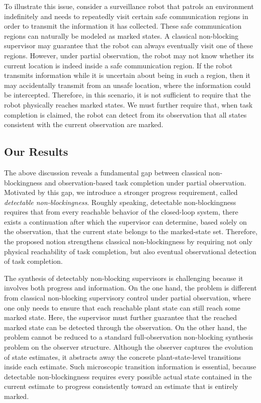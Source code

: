 \documentclass[twocolumn]{autart}
\begin{document}
To illustrate this issue, consider a surveillance robot that patrols an environment indefinitely and needs to repeatedly visit certain safe communication regions in order to transmit the information it has collected.  These safe communication regions can naturally be modeled as marked states.  A classical non-blocking supervisor may guarantee that the robot can always eventually visit one of these regions. However, under partial observation, the robot may not know whether its current location is indeed inside a safe communication region. 
If the robot transmits information while it is uncertain about being in such a region, then it may accidentally transmit from an unsafe location, where the information could be intercepted.  Therefore, in this scenario, it is not sufficient to require that the robot physically reaches marked states.  We must further require that, when task completion is claimed, the robot can detect from its observation that all states consistent with the current observation are marked.

\subsection{Our Results}
%
The above discussion reveals a fundamental gap between classical non-blockingness and observation-based task completion under partial observation. 
Motivated by this gap, we introduce a stronger progress requirement, called \emph{detectable non-blockingness}.
Roughly speaking, detectable non-blockingness requires that from every reachable behavior of the closed-loop system, there exists a continuation after which the supervisor can determine, based solely on the observation, that the current state belongs to the marked-state set.
Therefore, the proposed notion strengthens classical non-blockingness by requiring not only physical reachability of task completion, but also eventual observational detection of task completion.

The synthesis of detectably non-blocking supervisors is challenging because it involves both progress and information. On the one hand, the problem is different from classical non-blocking supervisory control under partial observation, where one only needs to ensure that each reachable plant state can still reach some marked state. Here, the supervisor must further guarantee that the reached marked state can be detected through the observation.
On the other hand, the problem cannot be reduced to a standard full-observation non-blocking synthesis problem on the observer structure.
Although the observer captures the evolution of state estimates, it abstracts away the concrete plant-state-level transitions inside each estimate.
Such microscopic transition information is essential, because detectable non-blockingness requires every possible actual state contained in the current estimate to progress consistently toward an estimate that is entirely marked.
\end{document}
